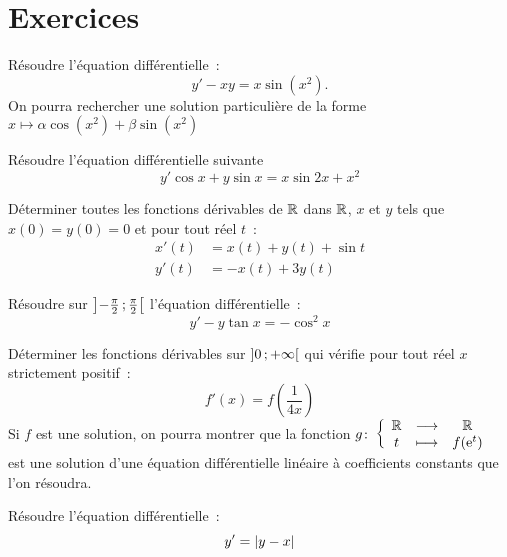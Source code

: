 \section{Exercices}
\begin{exercice}
    Résoudre l'équation différentielle~:
    \begin{equation}
        y'-xy = x\sin(x^2).
    \end{equation}
    On pourra rechercher une solution particulière de la forme \(x \longmapsto \alpha\cos(x^2)+\beta\sin(x^2)\)
\end{exercice}
\begin{exercice}
    Résoudre l'équation différentielle suivante
    \begin{equation}
        y'\cos x + y \sin x = x \sin 2x + x^2
    \end{equation}
\end{exercice}
\begin{exercice}
    Déterminer toutes les fonctions dérivables de \(\mathbb{R}\) dans \(\mathbb{R}\), \(x\) et \(y\) tels que \(x(0)=y(0)=0\) et pour tout réel \(t\)~:
    \begin{align}
        x'(t) & = x(t) + y(t) + \sin t \\
        y'(t) & = -x(t) + 3y(t)
    \end{align}
\end{exercice}
\begin{exercice}
    Résoudre sur \(\left] -\frac{\pi}{2} \, ;  \frac{\pi}{2} \right[\) l'équation différentielle~:
    \begin{equation}
        y'-y\tan x = -\cos^2 x
    \end{equation}
\end{exercice}
\begin{exercice}
    Déterminer les fonctions dérivables sur \(\left] 0 \, ;  +\infty \right[\) qui vérifie pour tout réel \(x\) strictement positif~:
    \begin{equation}
        f'(x) = f\left(\frac{1}{4x}\right)
    \end{equation}
    Si $f$ est une solution, on pourra montrer que la fonction \(g\colon \left\{\begin{array}{ccc} \mathbb{R} & \longrightarrow &\mathbb{R}\\ t & \longmapsto & f(\operatorname{e}^t) \end{array} \right.\) est une solution d'une équation différentielle linéaire à coefficients constants que l'on résoudra.
\end{exercice}
\begin{exercice}
    Résoudre l'équation différentielle~:
    \begin{equation}
        y' = \left\lvert y-x\right\rvert
    \end{equation}
\end{exercice}
